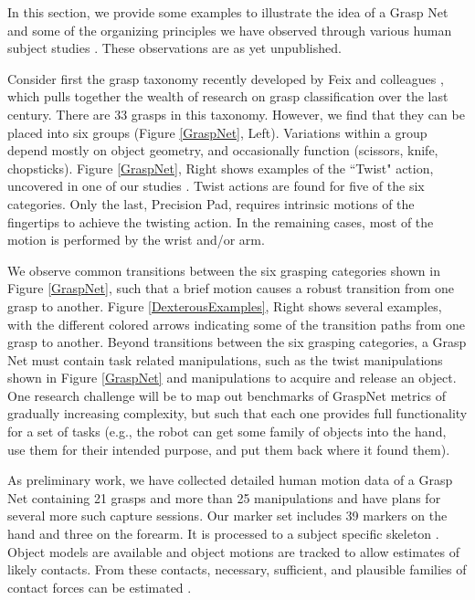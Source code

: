 In this section, we provide some examples to illustrate the idea of a Grasp Net and some of the organizing principles we have observed through various human subject studies \cite{Liu2014, JiaDatabase, Chang:2009:RSSWorkshop, Chang:2014, liu2016annotating}.    These observations are as yet unpublished.

Consider first the grasp taxonomy recently developed by Feix and colleagues \cite{feixgrasp}, which pulls together the wealth of research on grasp classification over the last century.   There are 33 grasps in this taxonomy.  However, we find that they can be placed into six groups (Figure \ref{GraspNet}, Left).  Variations within a group depend mostly on object geometry, and occasionally function (scissors, knife, chopsticks).    Figure \ref{GraspNet}, Right shows examples of the ``Twist" action, uncovered in one of our studies \cite{liu2016annotating}.    Twist actions are found for five of the six categories.   Only the last, Precision Pad, requires intrinsic motions of the fingertips to achieve the twisting action.   In the remaining cases, most of the motion is performed by the wrist and/or arm.

We observe common transitions between the six grasping categories shown in Figure \ref{GraspNet}, such that a brief motion causes a robust transition from one grasp to another.   Figure \ref{DexterousExamples}, Right shows several examples, with the different colored arrows indicating some of the transition paths from one grasp to another.   Beyond  transitions between the six grasping categories, a Grasp Net must contain task related manipulations, such as the twist manipulations shown in Figure \ref{GraspNet} and manipulations to acquire and release an object.   One research challenge will be to map out benchmarks of GraspNet metrics of gradually increasing complexity, but such that each one provides full functionality for a set of tasks (e.g., the robot can get some family of objects into the hand, use them for their intended purpose, and put them back where it found them).

As preliminary work, we have collected detailed human motion data of a Grasp Net containing 21 grasps and more than 25 manipulations and have plans for several more such capture sessions.    Our marker set includes 39 markers on the hand and three on the forearm.    It is processed to a subject specific skeleton \cite{Chang:CoR06,Chang:AoR06,Chang:twoAxis08}.   Object models are available and object motions are tracked to allow estimates of likely contacts.  From these contacts, necessary, sufficient, and plausible families of contact forces can be estimated \cite{Li:graspDB07}.

